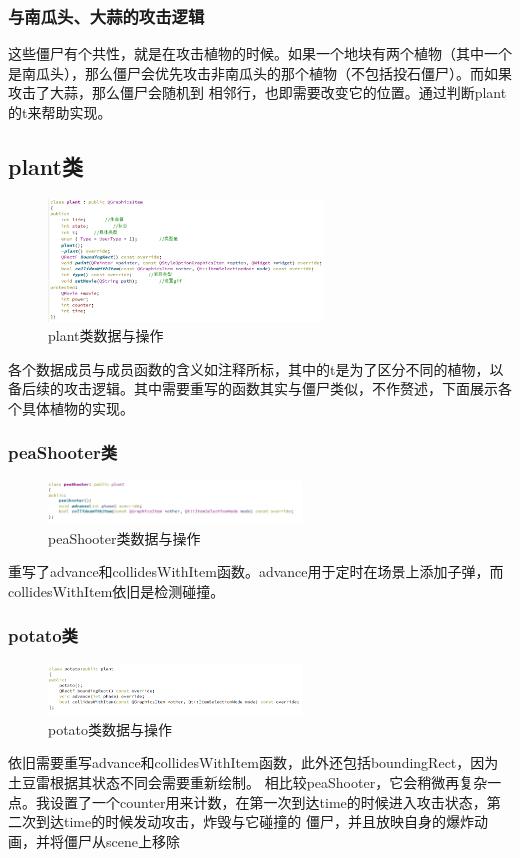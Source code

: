 \documentclass[12pt,a4paper,UTF8]{article}
\begin{document}
    \subsubsection{与南瓜头、大蒜的攻击逻辑}
    这些僵尸有个共性，就是在攻击植物的时候。如果一个地块有两个植物（其中一个是南瓜头），那么僵尸会优先攻击非南瓜头的那个植物（不包括投石僵尸）。而如果攻击了大蒜，那么僵尸会随机到
    相邻行，也即需要改变它的位置。通过判断plant的t来帮助实现。

       
    \subsection{plant类}
      \begin{figure}[H]
        \centering
      \includegraphics[width=0.65\textwidth]{figure/plant.png}
      \caption{plant类数据与操作}
      \end{figure}
      各个数据成员与成员函数的含义如注释所标，其中的t是为了区分不同的植物，以备后续的攻击逻辑。其中需要重写的函数其实与僵尸类似，不作赘述，下面展示各个具体植物的实现。

    \subsubsection{peaShooter类}
    \begin{figure}[H]
      \centering
    \includegraphics[width=0.6\textwidth]{figure/peaShooter.png}
    \caption{peaShooter类数据与操作}
    \end{figure}
    重写了advance和collidesWithItem函数。advance用于定时在场景上添加子弹，而collidesWithItem依旧是检测碰撞。
    \subsubsection{potato类}
      \begin{figure}[H]
        \centering
      \includegraphics[width=0.6\textwidth]{figure/potato.png}
      \caption{potato类数据与操作}
      \end{figure}
      依旧需要重写advance和collidesWithItem函数，此外还包括boundingRect，因为土豆雷根据其状态不同会需要重新绘制。
      相比较peaShooter，它会稍微再复杂一点。我设置了一个counter用来计数，在第一次到达time的时候进入攻击状态，第二次到达time的时候发动攻击，炸毁与它碰撞的
      僵尸，并且放映自身的爆炸动画，并将僵尸从scene上移除
\end{document}
